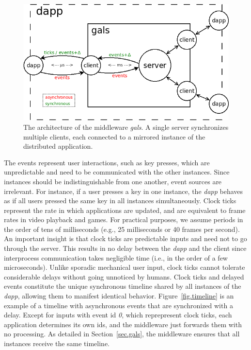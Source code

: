 \documentclass[sigplan,screen]{acmart}
\begin{document}
\begin{figure}[t]
  \centering
  \includegraphics[width=\linewidth]{middleware}
  \caption{
    \label{fig.middleware}
    The architecture of the middleware \emph{gals}.
    A single server synchronizes multiple clients, each connected to a mirrored
    instance of the distributed application.
  }
\end{figure}

The events represent user interactions, such as key presses, which are
unpredictable and need to be communicated with the other instances.
Since instances should be indistinguishable from one another, event sources are
irrelevant.
For instance, if a user presses a key in one instance, the \emph{dapp} behaves
as if all users pressed the same key in all instances simultaneously.
%
Clock ticks represent the rate in which applications are updated, and are
equivalent to frame rates in video playback and games.
For practical purposes, we assume periods in the order of tens of milliseconds
(e.g., 25 milliseconds or 40 frames per second).
An important insight is that clock ticks are predictable inputs and need not to
go through the server.
This results in no delay between the \emph{dapp} and the client since
interprocess communication takes negligible time (i.e., in the order of a few
microseconds).
Unlike sporadic mechanical user input, clock ticks cannot tolerate considerable
delays without going unnoticed by humans.
%
Clock ticks and delayed events constitute the unique synchronous timeline
shared by all instances of the \emph{dapp}, allowing them to manifest identical
behavior.
Figure~\ref{fig.timeline} is an example of a timeline with asynchronous events
that are synchronized with a delay.
Except for inputs with event id \emph{0}, which reprepresent clock ticks, each
application determines its own ids, and the middleware just forwards them with
no processing.
As detailed in Section~\ref{sec.gals}, the middleware ensures that all
instances receive the same timeline.
\end{document}
